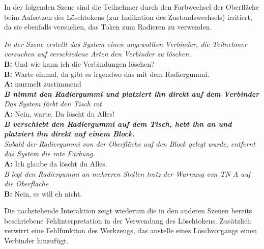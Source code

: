 In der folgenden Szene sind die Teilnehmer durch den Farbwechsel der Oberfläche beim Aufsetzen des Löschtokens (zur Indikation des Zustandswechsels) irritiert, da sie ebenfalls versuchen, das Token zum Radieren zu verwenden.

\begin{transkript}
	\emph{In der Szene erstellt das System einen ungewollten Verbinder, die Teilnehmer versuchen auf verschiedene Arten den Verbinder zu löschen.}\\
	\textbf{B:} Und wie kann ich die Verbindungen löschen?\\
	\textbf{B:} Warte einmal, da gibt es irgendwo das mit dem Radiergummi.\\
	\textbf{A:} murmelt zustimmend \\
	\emph{\textbf{B nimmt den Radiergummi und platziert ihn direkt auf dem Verbinder}}\\
	\emph{Das System färbt den Tisch rot}\\
	\textbf{A:} Nein, warte. Da löscht du Alles!\\
	\emph{\textbf{B verschiebt den Radiergummi auf dem Tisch, hebt ihn an und platziert ihn direkt auf einem Block.}}\\
	\emph{Sobald der Radiergummi von der Oberfläche auf den Block gelegt wurde, entfernt das System die rote Färbung.}\\
	\textbf{A:} Ich glaube da löscht du Alles.\\
	\emph{B legt den Radiergummi an mehreren Stellen trotz der Warnung von TN A auf die Oberfläche}\\
	\textbf{B:} Nein, es will eh nicht.\\
\end{transkript}

Die nachstehende Interaktion zeigt wiederum die in den anderen Szenen bereits beschriebene Fehlinterpretation in der Verwendung des Löschtokens. Zusätzlich verwirrt eine Fehlfunktion des Werkzeugs, das anstelle eines Löschvorgangs einen Verbinder hinzufügt.

